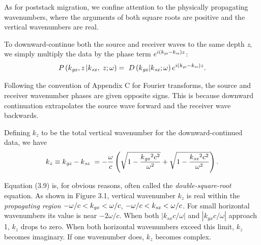 As for poststack migration, we confine attention to the physically propagating wavenumbers, where the arguments of both square roots are positive and the vertical wavenumbers are real.

To downward-continue both the source and receiver waves to the same depth \textit{z}, we simply multiply the data by the phase term \(e^{i \left(k_{\text{\textit{gz}}}-k_{\text{\textit{sz}}}\right)z}\):
\begin{equation}\text{\textit{$P$}}\left(\text{\textit{$k$}}_{\text{\textit{gx}}},\text{\textit{$z$}}\left|\text{\textit{$k$}}_{\text{\textit{sx}}},\right.\text{\textit{$z$}};\omega
\right) =\text{  }\text{\textit{$D$}}\left(\text{\textit{$k$}}_{\text{\textit{gx}}}|\text{\textit{$k$}}_{\text{\textit{sx}}};\omega \right) e^{i\left(\text{\textit{$k$}}_{\text{\textit{gz}}}-\text{\textit{$k$}}_{\text{\textit{sz}}}\right)\text{\textit{$z$}}}.\end{equation}

Following the convention of Appendix C for Fourier transforms, the source and receiver wavenumber phases are given opposite signs. This is because
downward continuation extrapolates the source wave forward and the receiver wave backwards.

Defining \(k_z\) to be the total vertical wavenumber for the downward-continued data, we have
\begin{equation}\text{\textit{$k$}}_{\text{\textit{$z$}}}\equiv \text{\textit{$k$}}_{\text{\textit{gz}}}-\text{\textit{$k$}}_{\text{\textit{sz}}}\text{
 }=- \frac{\omega }{\text{\textit{$c$}}} \left( \sqrt{1-\frac{\text{\textit{$k$}}_{\text{\textit{gx}}}{}^2\text{\textit{$c$}}^2}{\omega ^2}} +\sqrt{1-\frac{\text{\textit{$k$}}_{\text{\textit{sx}}}{}^2\text{\textit{$c$}}^2}{\omega
^2}}\right).\end{equation}

Equation (3.9) is, for obvious reasons, often called the \textit{double-square-root} equation. As shown in Figure 3.1, vertical wavenumber
\(k_z\) is real within the \textit{propagating region} \(-\omega /c<k_{\text{\textit{gx}}}<\omega /c\), \(-\omega /c<k_{\text{\textit{sx}}}<\omega
/c\). For small horizontal wavenumbers its value is near \(-2\omega /c\). When both \(\left|k_{\textit{sx}}c/\omega \right|\) and \(\left|k_{\textit{gx}}c/\omega
\right|\) approach 1, \(k_z\) drops to zero.  When both horizontal wavenumbers exceed this limit, \(k_z\) becomes imaginary. If one wavenumber does, \(k_z\) becomes complex.

